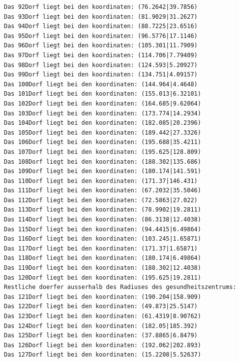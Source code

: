 \documentclass{article}
\begin{document}
\begin{verbatim}
Das 92Dorf liegt bei den koordinaten: (76.2642|39.7856)
Das 93Dorf liegt bei den koordinaten: (81.9029|31.2627)
Das 94Dorf liegt bei den koordinaten: (88.7225|23.6516)
Das 95Dorf liegt bei den koordinaten: (96.5776|17.1146)
Das 96Dorf liegt bei den koordinaten: (105.301|11.7909)
Das 97Dorf liegt bei den koordinaten: (114.706|7.79409)
Das 98Dorf liegt bei den koordinaten: (124.593|5.20927)
Das 99Dorf liegt bei den koordinaten: (134.751|4.09157)
Das 100Dorf liegt bei den koordinaten: (144.964|4.4648)
Das 101Dorf liegt bei den koordinaten: (155.013|6.32101)
Das 102Dorf liegt bei den koordinaten: (164.685|9.62064)
Das 103Dorf liegt bei den koordinaten: (173.774|14.2934)
Das 104Dorf liegt bei den koordinaten: (182.085|20.2396)
Das 105Dorf liegt bei den koordinaten: (189.442|27.3326)
Das 106Dorf liegt bei den koordinaten: (195.688|35.4211)
Das 107Dorf liegt bei den koordinaten: (195.625|128.809)
Das 108Dorf liegt bei den koordinaten: (188.302|135.686)
Das 109Dorf liegt bei den koordinaten: (180.174|141.591)
Das 110Dorf liegt bei den koordinaten: (171.37|146.431)
Das 111Dorf liegt bei den koordinaten: (67.2032|35.5046)
Das 112Dorf liegt bei den koordinaten: (72.5863|27.022)
Das 113Dorf liegt bei den koordinaten: (78.9902|19.2811)
Das 114Dorf liegt bei den koordinaten: (86.3138|12.4038)
Das 115Dorf liegt bei den koordinaten: (94.4415|6.49864)
Das 116Dorf liegt bei den koordinaten: (103.245|1.65871)
Das 117Dorf liegt bei den koordinaten: (171.37|1.65871)
Das 118Dorf liegt bei den koordinaten: (180.174|6.49864)
Das 119Dorf liegt bei den koordinaten: (188.302|12.4038)
Das 120Dorf liegt bei den koordinaten: (195.625|19.2811)
Restliche doerfer ausserhalb des Radiuses des gesundheitszentrums: 
Das 121Dorf liegt bei den koordinaten: (190.204|158.909)
Das 122Dorf liegt bei den koordinaten: (49.873|25.5147)
Das 123Dorf liegt bei den koordinaten: (61.4319|8.90762)
Das 124Dorf liegt bei den koordinaten: (182.05|185.392)
Das 125Dorf liegt bei den koordinaten: (37.8865|6.8479)
Das 126Dorf liegt bei den koordinaten: (192.062|202.893)
Das 127Dorf liegt bei den koordinaten: (15.2208|5.52637)

\end{verbatim}
\end{document}
